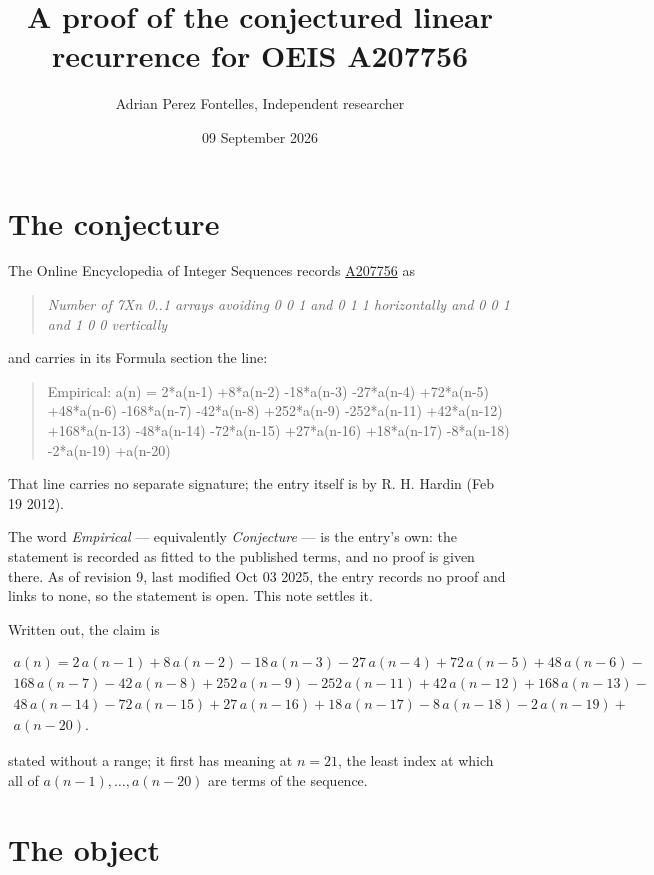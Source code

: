 \documentclass[11pt]{article}
\title{A proof of the conjectured linear recurrence for OEIS A207756}
\author{Adrian Perez Fontelles, Independent researcher}
\date{09 September 2026}
\theoremstyle{definition}
\begin{document}
\maketitle
\section{The conjecture}

The Online Encyclopedia of Integer Sequences records \href{https://oeis.org/A207756}{A207756} as

\begin{quote}\itshape Number of 7Xn 0..1 arrays avoiding 0 0 1 and 0 1 1 horizontally and 0 0 1 and 1 0 0 vertically\end{quote}

and carries in its Formula section the line:

\begin{quote}\ttfamily Empirical: a(n) = 2*a(n-1) +8*a(n-2) -18*a(n-3) -27*a(n-4) +72*a(n-5) +48*a(n-6) -168*a(n-7) -42*a(n-8) +252*a(n-9) -252*a(n-11) +42*a(n-12) +168*a(n-13) -48*a(n-14) -72*a(n-15) +27*a(n-16) +18*a(n-17) -8*a(n-18) -2*a(n-19) +a(n-20)\end{quote}

That line carries no separate signature; the entry itself is by R. H. Hardin (Feb 19 2012).

The word {\itshape Empirical} --- equivalently {\itshape Conjecture} --- is the entry's own: the statement is recorded as fitted to the published terms, and no proof is given there. As of revision 9, last modified Oct 03 2025, the entry records no proof and links to none, so the statement is open. This note settles it.

Written out, the claim is

\begin{multline*} a(n) = 2\,a(n-1) + 8\,a(n-2) - 18\,a(n-3) - 27\,a(n-4) + 72\,a(n-5) + 48\,a(n-6) - \\ 168\,a(n-7) - 42\,a(n-8) + 252\,a(n-9) - 252\,a(n-11) + 42\,a(n-12) + 168\,a(n-13) - \\ 48\,a(n-14) - 72\,a(n-15) + 27\,a(n-16) + 18\,a(n-17) - 8\,a(n-18) - 2\,a(n-19) + \\ a(n-20). \end{multline*}

stated without a range; it first has meaning at $n = 21$, the least index at which all of $a(n-1),\dots,a(n-20)$ are terms of the sequence.

\section{The object}
\end{document}
